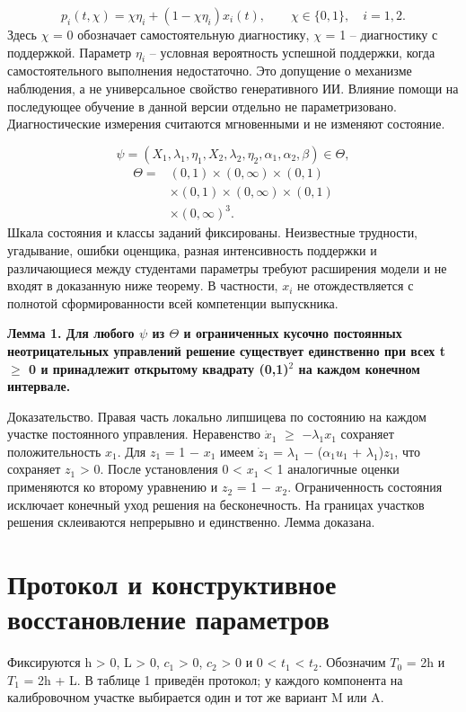\documentclass[blind]{psta}
\begin{document}
\begin{equation}
p_i(t,\chi )=\chi \eta_i+(1-\chi \eta_i)x_i(t),\qquad \chi \in\{0,1\},\quad i=1,2.
\tag{3}
\label{eq:3}
\end{equation}
Здесь $\chi$ = 0 обозначает самостоятельную диагностику, $\chi$ = 1 – диагностику с поддержкой. Параметр $\eta_{i}$ – условная вероятность успешной поддержки, когда самостоятельного выполнения недостаточно. Это допущение о механизме наблюдения, а не универсальное свойство генеративного ИИ. Влияние помощи на последующее обучение в данной версии отдельно не параметризовано. Диагностические измерения считаются мгновенными и не изменяют состояние.

\[
\psi=(X_1,\lambda_1,\eta_1,X_2,\lambda_2,\eta_2,\alpha_1,\alpha_2,\beta)\in\Theta,
\]
\[
\begin{aligned}\Theta=&(0,1)\times(0,\infty)\times(0,1)\\&\times(0,1)\times(0,\infty)\times(0,1)\\&\times(0,\infty)^3.\end{aligned}
\]
Шкала состояния и классы заданий фиксированы. Неизвестные трудности, угадывание, ошибки оценщика, разная интенсивность поддержки и различающиеся между студентами параметры требуют расширения модели и не входят в доказанную ниже теорему. В частности, $x_{i}$ не отождествляется с полнотой сформированности всей компетенции выпускника.

\par\medskip\noindent\textbf{Лемма 1. Для любого $\psi$ из $\Theta$ и ограниченных кусочно постоянных неотрицательных управлений решение существует единственно при всех t $\ge$ 0 и принадлежит открытому квадрату (0,1)$^{2}$ на каждом конечном интервале.}\par\smallskip
Доказательство. Правая часть локально липшицева по состоянию на каждом участке постоянного управления. Неравенство $\dot{x}_{1}$ $\ge$ $-$$\lambda_{1}$$x_{1}$ сохраняет положительность $x_{1}$. Для $z_{1}$ = 1 $-$ $x_{1}$ имеем $\dot{z}_{1}$ = $\lambda_{1}$ $-$ ($\alpha_{1}$$u_{1}$ + $\lambda_{1}$)$z_{1}$, что сохраняет $z_{1}$ > 0. После установления 0 < $x_{1}$ < 1 аналогичные оценки применяются ко второму уравнению и $z_{2}$ = 1 $-$ $x_{2}$. Ограниченность состояния исключает конечный уход решения на бесконечность. На границах участков решения склеиваются непрерывно и единственно. Лемма доказана.

\FloatBarrier
\section{Протокол и конструктивное восстановление параметров}
Фиксируются h > 0, L > 0, $c_{1}$ > 0, $c_{2}$ > 0 и 0 < $t_{1}$ < $t_{2}$. Обозначим $T_{0}$ = 2h и $T_{1}$ = 2h + L. В таблице 1 приведён протокол; у каждого компонента на калибровочном участке выбирается один и тот же вариант M или A.
\end{document}
